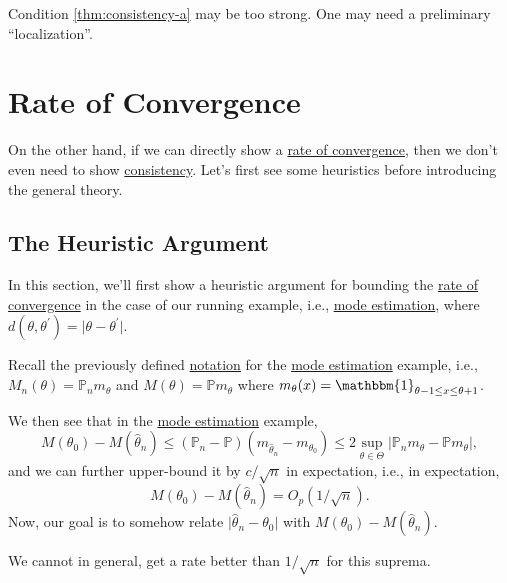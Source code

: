 \begin{remark}
	Condition \autoref{thm:consistency-a} may be too strong. One may need a preliminary ``localization''.
\end{remark}

\section{Rate of Convergence}
On the other hand, if we can directly show a \hyperref[def:rate-of-convergence]{rate of convergence}, then we don't even need to show \hyperref[def:consistent]{consistency}. Let's first see some heuristics before introducing the general theory.

\subsection{The Heuristic Argument}
In this section, we'll first show a heuristic argument for bounding the \hyperref[def:rate-of-convergence]{rate of convergence} in the case of our running example, i.e., \hyperref[eg:mode-estimation]{mode estimation}, where \(d(\theta , \theta ^{\prime} ) = \vert \theta - \theta ^{\prime} \vert \).

\begin{prev}
	Recall the previously defined \hyperref[not:M-estimation]{notation} for the \hyperref[eg:mode-estimation]{mode estimation} example, i.e., \(M_n(\theta ) = \mathbb{P} _n m_\theta \) and \(M(\theta ) = \mathbb{P} m_\theta \) where \(m_\theta (x) = \mathbbm{1}_{\theta -1 \leq x \leq \theta +1} \).
\end{prev}

We then see that in the \hyperref[eg:mode-estimation]{mode estimation} example,
\[
	M(\theta _0) - M(\hat{\theta} _n)
	\leq (\mathbb{P} _n - \mathbb{P} ) (m_{\hat{\theta } _n } - m_{\theta _0})
	\leq 2 \sup _{\theta \in \Theta } \vert \mathbb{P} _n m_\theta - \mathbb{P} m_\theta \vert,
\]
and we can further upper-bound it by \(c / \sqrt{n} \) in expectation, i.e., in expectation,
\[
	M(\theta _0) - M(\hat{\theta } _n ) = O_p(1 / \sqrt{n} ).
\]
Now, our goal is to somehow relate \(\vert \hat{\theta} _n - \theta _0 \vert \) with \(M(\theta _0) - M(\hat{\theta} _n)\).

\begin{note}
	We cannot in general, get a rate better than \(1 / \sqrt{n} \) for this suprema.
\end{note}

